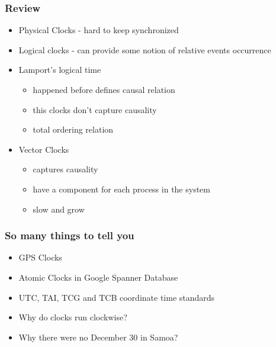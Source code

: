 \documentclass[aspectratio=169, 15pt,usenames,dvipsnames]{beamer}
\begin{document}

	\begin{gdblank}
		\frametitle{Review}
		\begin{itemize}
			\large
			\item Physical Clocks - hard to keep synchronized
			\item Logical clocks - can provide some notion of relative events occurrence
			\item Lamport's logical time
			      \begin{itemize}
			      	\item happened before defines causal relation
			      	\item this clocks don't capture causality
			      	\item total ordering relation
			      \end{itemize}
			\item Vector Clocks
			      \begin{itemize}
			      	\item captures causality
			      	\item have a component for each process in the system
			      	\item slow and grow
			      \end{itemize}
		\end{itemize}
	\end{gdblank} 
	\begin{gdblank}
		\frametitle{So many things to tell you}
		\begin{itemize}
			\item GPS Clocks
			\item Atomic Clocks in Google Spanner Database
			\item UTC, TAI, TCG and TCB coordinate time standards
			\item Why do clocks run clockwise?
			\item Why there were no December 30 in Samoa?
		\end{itemize}
	\end{gdblank} 
\end{document}
